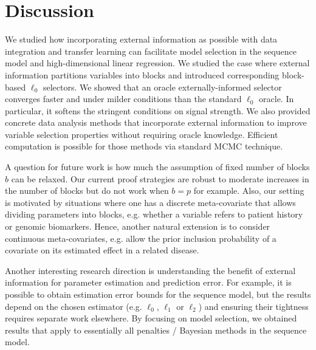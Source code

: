 \documentclass[bj,authoryear]{imsart}
\theoremstyle{plain}
\begin{document}
\section{Discussion}\label{sec:discussion}

We studied %
how incorporating external information as possible with data integration and transfer learning can facilitate model selection in the sequence model and high-dimensional linear regression. We studied the case where external information partitions
variables %
into blocks %
and introduced corresponding block-based %
$\ell_0$ selectors. %
We showed that an oracle externally-informed selector converges faster and under milder conditions than the standard $\ell_0$ oracle. In particular, it softens the stringent conditions on signal strength. We also provided concrete data analysis methods that incorporate external information to improve variable selection properties without requiring oracle knowledge. Efficient computation is possible for those methods via standard MCMC technique.

A question %
for future work is how much the assumption of fixed number of blocks $b$ can be relaxed. Our current proof strategies %
are robust to moderate increases in the number of blocks but do not work when $b=p$ for example. Also, our setting is motivated by situations where one has a discrete meta-covariate that allows dividing parameters into blocks, e.g. whether a variable refers to patient history or genomic biomarkers. Hence, another natural extension is to consider continuous meta-covariates, e.g. allow the prior inclusion probability of a covariate on its estimated effect in a related disease.

Another interesting research direction is understanding the benefit of external information for parameter estimation and prediction error.
For example, it is possible to obtain estimation error bounds for the sequence model, but the results depend on the chosen estimator (e.g. $\ell_0$, $\ell_1$ or $\ell_2$) and ensuring their tightness requires separate work elsewhere. By focusing on model selection, we obtained results that apply to essentially all penalties / Bayesian methods in the sequence model.
\end{document}
